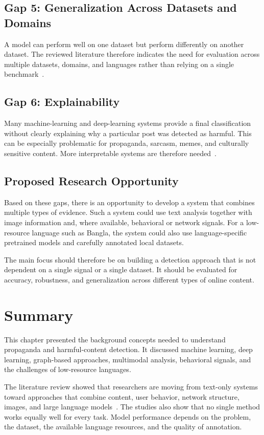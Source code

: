 \subsection{Gap 5: Generalization Across Datasets and Domains}
A model can perform well on one dataset but perform differently on another dataset.
The reviewed literature therefore indicates the need for evaluation across multiple
datasets, domains, and languages rather than relying on a single
benchmark~\cite{ahmad2025}.

\subsection{Gap 6: Explainability}
Many machine-learning and deep-learning systems provide a final classification
without clearly explaining why a particular post was detected as harmful. This can
be especially problematic for propaganda, sarcasm, memes, and culturally sensitive
content. More interpretable systems are therefore
needed~\cite{ahmad2025,hee2022,maarouf2024}.

\subsection{Proposed Research Opportunity}
Based on these gaps, there is an opportunity to develop a system that combines
multiple types of evidence. Such a system could use text analysis together with
image information and, where available, behavioral or network signals. For a
low-resource language such as Bangla, the system could also use language-specific
pretrained models and carefully annotated local datasets.

The main focus should therefore be on building a detection approach that is not
dependent on a single signal or a single dataset. It should be evaluated for
accuracy, robustness, and generalization across different types of online content.

\section{Summary}
This chapter presented the background concepts needed to understand propaganda and
harmful-content detection. It discussed machine learning, deep learning,
graph-based approaches, multimodal analysis, behavioral signals, and the challenges
of low-resource languages.

The literature review showed that researchers are moving from text-only systems
toward approaches that combine content, user behavior, network structure, images,
and large language models~\cite{duridi2025,plikynas2025,lora2023,hasan2026,ahmad2025,lin2024,hee2022,declerck2024,sela2025,schneider2026,romim2022,haider2020,wang2022,pina2025,gaeta2025,maarouf2024}.
The studies also show that no single method works equally well for every task.
Model performance depends on the problem, the dataset, the available language
resources, and the quality of annotation.

